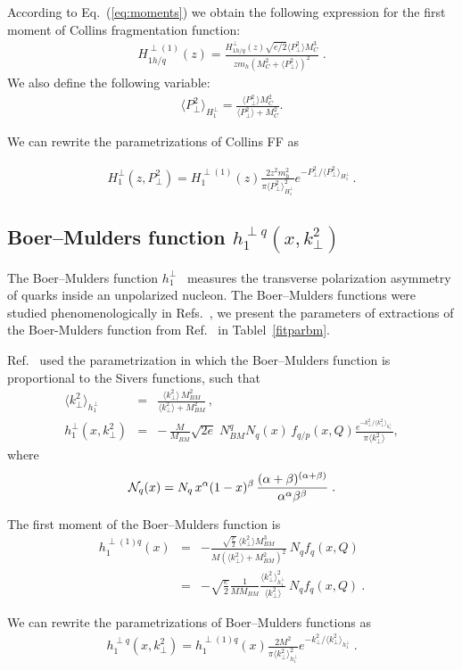 \documentclass[a4paper,11pt]{article}
\newcommand{\ba}{\begin{eqnarray}}
\newcommand{\ea}{\end{eqnarray}}
\newcommand{\la}{\langle}
\newcommand{\ra}{\rangle}
\newcommand{\mh}{ m_h }
\def\kperp{k_\perp}
\def\pperp{P_\perp}
\def\avkperp{\la \kperp^2 \ra}
\def\avpperp{\la \pperp^2 \ra}
\begin{document}
According to Eq.~(\ref{eq:moments}) we obtain the following expression for the first moment of
Collins fragmentation function:
\ba
H_{1 h/q}^{\perp (1)}(z) = \frac{H_{1 h/q}^{\perp}(z) \sqrt{e/2}  \avpperp M_C^3}{z \mh  (M_C^2+\avpperp)^2}\; .
\ea
We also define the following variable:
\ba
\avpperp_{H_1^\perp} = \frac{\avpperp M_C^2 }{\avpperp + M_C^2} .
\ea

We can rewrite the parametrizations of Collins FF as

\ba
H_{1}^{\perp}(z,\pperp^2) =  H_{1}^{\perp (1)}(z)   \frac{2 z^2 \mh^2}{\pi \avpperp_{H_{1}^\perp}^2} e^{-\pperp^2/{\avpperp_{H_{1}^\perp}}}
\label{coll-funct_new} \, .
\ea

\subsection{\boldmath Boer--Mulders function $h_{1}^{\perp q}(x,k_\perp^{2})$}
\label{App:basis-h1perp}

The Boer--Mulders function $h_{1}^{\perp}$~\cite{Boer:1997nt} measures
the transverse polarization asymmetry of quarks inside an unpolarized
nucleon. The Boer--Mulders functions were studied phenomenologically in
Refs.~\cite{Barone:2009hw,Barone:2010gk,Barone:2015ksa},  we present the parameters of extractions of 
the Boer-Mulders function from Ref.~\cite{Barone:2010gk} in Tablel~\ref{fitparbm}.

Ref.~\cite{Barone:2010gk} used the parametrization in which the Boer--Mulders function is proportional to the Sivers functions, such that
\ba
\avkperp_{h_1^\perp} &=& \frac{\avkperp \, M^2_{BM}}{\avkperp + M^2_{BM}} \, , \\
h_{1}^{\perp}(x, \kperp^2) &= &
- \,\frac{M}{M_{BM}}
\sqrt{2e}\; N_{BM}^q N_q (x)
\, f_{q/p} (x, Q)\frac{e^{-\kperp^2/\avkperp_{h_{1}^{\perp}}}}{\pi\avkperp},
\label{BM-dist}
\ea
 where
%
\ba
{\cal N}_q(x)= N_q \, x^{\alpha} (1-x)^{\beta} \,
\frac{(\alpha + \beta)^{(\alpha +\beta)}}
{\alpha^{\alpha} \beta^{\beta}}\; .
 \ea

The first moment of the Boer--Mulders function is
\ba
h_{1}^{\perp (1) q}(x)  &=& -\frac{\sqrt{\frac{e}{2}} \ \avkperp M_{BM}^3}{M (\avkperp + M_{BM}^2)^2}  \ {N}_q f_q(x, Q)  \nonumber \\
&=& -\sqrt{\frac{e}{2}} \frac{1}{M M_{BM}}  \frac{\avkperp_{h_1^\perp}^2}{\avkperp}    \ {N}_q  f_q(x, Q)
\label{bm} \ .
\ea

We can rewrite the parametrizations of Boer--Mulders functions as
\ba
h_{1}^{\perp q}(x,\kperp^2) =  h_{1}^{\perp (1) q}(x)   \frac{2 M^2}{\pi \avkperp_{h_{1}^\perp}^2} e^{-\kperp^2/{\avkperp_{h_{1}^\perp}}}\label{bm_new} \ .
\ea
\end{document}
